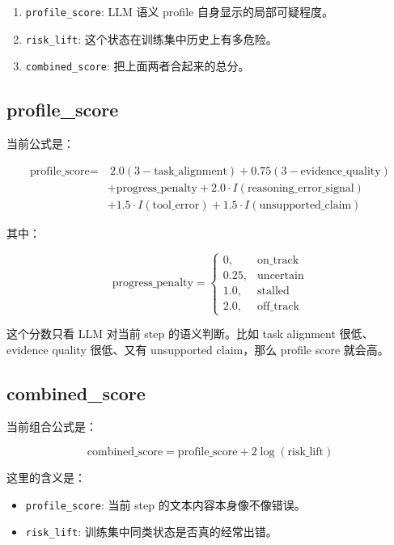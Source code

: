 \documentclass[UTF8,a4paper,11pt]{ctexart}
\begin{document}
\begin{enumerate}
  \item \texttt{profile\_score}: LLM 语义 profile 自身显示的局部可疑程度。
  \item \texttt{risk\_lift}: 这个状态在训练集中历史上有多危险。
  \item \texttt{combined\_score}: 把上面两者合起来的总分。
\end{enumerate}

\subsection{profile\_score}

当前公式是：

\[
\begin{aligned}
\text{profile\_score}
=&\ 2.0(3-\text{task\_alignment})
+0.75(3-\text{evidence\_quality})\\
&+\text{progress\_penalty}
+2.0\cdot I(\text{reasoning\_error\_signal})\\
&+1.5\cdot I(\text{tool\_error})
+1.5\cdot I(\text{unsupported\_claim})
\end{aligned}
\]

其中：

\[
\text{progress\_penalty}=
\begin{cases}
0, & \text{on\_track}\\
0.25, & \text{uncertain}\\
1.0, & \text{stalled}\\
2.0, & \text{off\_track}
\end{cases}
\]

这个分数只看 LLM 对当前 step 的语义判断。比如 task alignment 很低、evidence quality 很低、又有 unsupported claim，那么 profile score 就会高。

\subsection{combined\_score}

当前组合公式是：

\[
\text{combined\_score}
=
\text{profile\_score}
+2\log(\text{risk\_lift})
\]

这里的含义是：

\begin{itemize}
  \item \texttt{profile\_score}: 当前 step 的文本内容本身像不像错误。
  \item \texttt{risk\_lift}: 训练集中同类状态是否真的经常出错。
\end{itemize}
\end{document}
